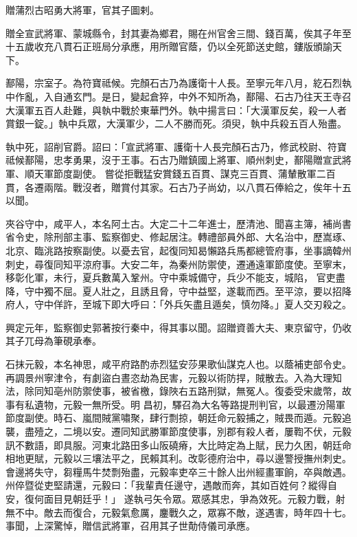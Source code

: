 \begin{pinyinscope}
 贈蒲烈古昭勇大將軍，官其子圖剌。



 贈全宣武將軍、蒙城縣令，封其妻為鄉君，賜在州官舍三間、錢百萬，俟其子年至十五歲收充八貫石正班局分承應，用所贈官蔭，仍以全死節送史館，鏤版頒諭天
 下。



 鄯陽，宗室子。為符寶祗候。完顏石古乃為護衛十人長。至寧元年八月，紇石烈執中作亂，入自通玄門。是日，變起倉猝，中外不知所為，鄯陽、石古乃往天王寺召大漢軍五百人赴難，與執中戰於東華門外。執中揚言曰：「大漢軍反矣，殺一人者賞銀一錠。」執中兵眾，大漢軍少，二人不勝而死。須臾，執中兵殺五百人殆盡。



 執中死，詔削官爵。詔曰：「宣武將軍、護衛十人長完顏石古乃，修武校尉、符寶祗候鄯陽，忠孝勇果，沒于王事。石古乃贈鎮國上將軍、順州刺史，鄯陽贈宣武將軍、順天軍節度副使。
 嘗從拒戰猛安賞錢五百貫、謀克三百貫、蒲輦散軍二百貫，各遷兩階。戰沒者，贈賞付其家。石古乃子尚幼，以八貫石俸給之，俟年十五以聞。



 夾谷守中，咸平人，本名阿土古。大定二十二年進士，歷清池、聞喜主簿，補尚書省令史，除刑部主事、監察御史、修起居注。轉禮部員外郎、大名治中，歷嵩琢、北京、臨洮路按察副使。以憂去官，起復同知曷懶路兵馬都總管府事，坐事謫韓州刺史，尋復同知平涼府事。大安二年，為秦州防禦使，遷通遠軍節度使。至寧末，移彰化軍，未行，夏兵數萬入鞏州。守中乘城備守，兵少不能支，城陷，
 官吏盡降，守中獨不屈。夏人壯之，且誘且脅，守中益堅，遂載而西。至平涼，要以招降府人，守中佯許，至城下即大呼曰：「外兵矢盡且遁矣，慎勿降。」夏人交刃殺之。



 興定元年，監察御史郭著按行秦中，得其事以聞。詔贈資善大夫、東京留守，仍收其子兀母為筆硯承奉。



 石抹元毅，本名神思，咸平府路酌赤烈猛安莎果歌仙謀克人也。以蔭補吏部令史。再調景州寧津令，有劇盜白晝恣劫為民害，元毅以術防捍，賊散去。入為大理知法，除同知亳州防禦使事，被省檄，錄陜右五路刑獄，無冤人。復委受宋歲幣，故事有私遺物，元毅一無所受。明
 昌初，驛召為大名等路提刑判官，以最遷汾陽軍節度副使。時石、嵐間賊黨嘯聚，肆行剽掠，朝廷命元毅捕之，賊畏而遁。元毅追襲，盡殪之，二境以安。遷同知武勝軍節度使事，別郡有殺人者，屢鞫不伏，元毅訊不數語，即具服。河東北路田多山阪磽瘠，大比時定為上賦，民力久困，朝廷命相地更賦，元毅以三壤法平之，民賴其利。改彰德府治中，尋以邊警授撫州刺史。會邊將失守，芻糧馬牛焚剽殆盡，元毅率吏卒三十餘人出州經畫軍餉，卒與敵遇。州倅暨從吏堅請還，元毅曰：「我輩責任邊守，遇敵而奔，其如百姓何？縱得自安，復何面目見朝廷乎！」
 遂執弓矢令眾。眾感其忠，爭為效死。元毅力戰，射無不中。敵去而復合，元毅氣愈厲，鏖戰久之，眾寡不敵，遂遇害，時年四十七。事聞，上深驚悼，贈信武將軍，召用其子世勣侍儀司承應。




\end{pinyinscope}
